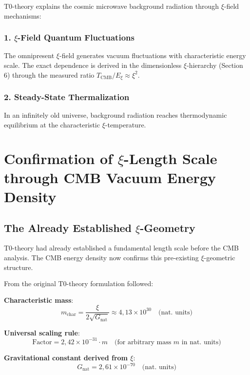 \documentclass[12pt,a4paper]{article}
\begin{document}
	T0-theory explains the cosmic microwave background radiation through $\xi$-field mechanisms:
	
	\subsubsection{1. $\xi$-Field Quantum Fluctuations}
	The omnipresent $\xi$-field generates vacuum fluctuations with characteristic energy scale. The exact dependence is derived in the dimensionless $\xi$-hierarchy (Section 6) through the measured ratio $T_{\text{CMB}}/E_\xi \approx \xi^2$.
	
	\subsubsection{2. Steady-State Thermalization}
	In an infinitely old universe, background radiation reaches thermodynamic equilibrium at the characteristic $\xi$-temperature.
	
	\section{Confirmation of $\xi$-Length Scale through CMB Vacuum Energy Density}
	
	\subsection{The Already Established $\xi$-Geometry}
	
	\begin{important}
		T0-theory had already established a fundamental length scale before the CMB analysis. The CMB energy density now confirms this pre-existing $\xi$-geometric structure.
	\end{important}
	
	From the original T0-theory formulation followed:
	
	\textbf{Characteristic mass}:
	\begin{equation}
		m_{\text{char}} = \frac{\xi}{2\sqrt{G_{\text{nat}}}} \approx 4{,}13 \times 10^{30} \quad \text{(nat. units)}
	\end{equation}
	
	\textbf{Universal scaling rule}:
	\begin{equation}
		\text{Factor} = 2{,}42 \times 10^{-31} \cdot m \quad \text{(for arbitrary mass } m \text{ in nat. units)}
	\end{equation}
	
	\textbf{Gravitational constant derived from $\xi$}:
	\begin{equation}
		G_{\text{nat}} = 2{,}61 \times 10^{-70} \quad \text{(nat. units)}
	\end{equation}
	
\end{document}
